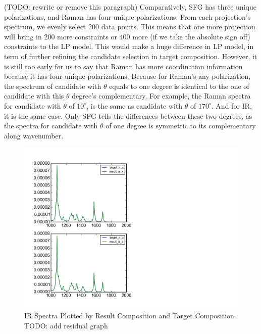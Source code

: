 (TODO: rewrite or remove this paragraph) Comparatively, SFG has three unique polarizations, and Raman has four unique polarizations. From each projection's spectrum, we evenly select 200 data points. This means that one more projection will bring in 200 more constraints or 400 more (if we take the absolute sign off) constraints to the LP model. This would make a huge difference in LP model, in term of further refining the candidate selection in target composition. However, it is still too early for us to say that Raman has more coordination information because it has four unique polarizations. Because for Raman's any polarization, the spectrum of candidate with $\theta$ equals to one degree is identical to the one of candidate with this $\theta$ degree's complementary. For example, the Raman spectra for candidate with $\theta$ of $10^{\circ}$, is the same as candidate with $\theta$ of $170^{\circ}$. And for IR, it is the same case. Only SFG tells the differences between these two degrees, as the spectra for candidate with $\theta$ of one degree is symmetric to its complementary along wavenumber. \\

\begin{figure}[!ht] \label{fig:5.2}
\centering
\includegraphics[scale=0.7]{Figures/result_target_plotting_ir16.png}
\caption{IR Spectra Plotted by Result Composition and Target Composition. TODO: add residual graph} 
\end{figure}


